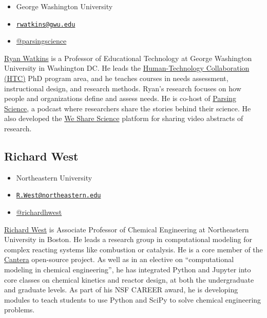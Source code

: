 \documentclass[]{book}
\providecommand{\tightlist}{%
  \setlength{\itemsep}{0pt}\setlength{\parskip}{0pt}}
\begin{document}
\begin{itemize}
\tightlist
\item
  George Washington University
\item
  \href{mailto:rwatkins@gwu.edu}{\nolinkurl{rwatkins@gwu.edu}}
\item
  \href{https://twitter.com/parsingscience}{@parsingscience}
\end{itemize}

\href{https://gsehd.gwu.edu/directory/ryan-watkins}{Ryan Watkins} is a
Professor of Educational Technology at George Washington University in
Washington DC. He leads the
\href{https://go.gwu.edu/phd}{Human-Technology Collaboration (HTC)} PhD
program area, and he teaches courses in needs assessment, instructional
design, and research methods. Ryan's research focuses on how people and
organizations define and assess needs. He is co-host of
\href{https://parsingscience.org/}{Parsing Science}, a podcast where
researchers share the stories behind their science. He also developed
the \href{https://wesharescience.org/}{We Share Science} platform for
sharing video abstracts of research.

\subsection{Richard West}\label{richard-west}

\begin{itemize}
\tightlist
\item
  Northeastern University
\item
  \href{mailto:R.West@northeastern.edu}{\nolinkurl{R.West@northeastern.edu}}
\item
  \href{https://twitter.com/richardhwest}{@richardhwest}
\end{itemize}

\href{https://web.northeastern.edu/comocheng/}{Richard West} is
Associate Professor of Chemical Engineering at Northeastern University
in Boston. He leads a research group in computational modeling for
complex reacting systems like combustion or catalysis. He is a core
member of the \href{https://cantera.org/}{Cantera} open-source project.
As well as in an elective on ``computational modeling in chemical
engineering'', he has integrated Python and Jupyter into core classes on
chemical kinetics and reactor design, at both the undergraduate and
graduate levels. As part of his NSF CAREER award, he is developing
modules to teach students to use Python and SciPy to solve chemical
engineering problems.
\end{document}
